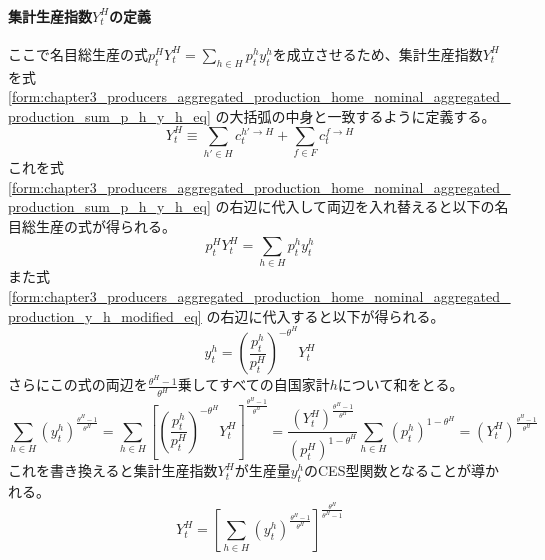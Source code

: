 \paragraph{集計生産指数\(Y_t^H\)の定義}
\label{sec:chapter3_producers_aggregated_production_home_Y_H_definition}
ここで名目総生産の式\(p_t^HY_t^H=\sum_{h\in H}p_t^hy_t^h\)を成立させるため、集計生産指数\(Y_t^H\)を式
\eqref{form:chapter3_producers_aggregated_production_home_nominal_aggregated_production_sum_p_h_y_h_eq}
の大括弧の中身と一致するように定義する。
\begin{equation}
\label{form:chapter3_producers_aggregated_production_home_Y_H_definition_Y_H_def}
    Y_t^H\equiv\sum_{h'\in H}c_t^{h'\to H}+\sum_{f\in F}c_t^{f\to H}
\end{equation}
これを式
\eqref{form:chapter3_producers_aggregated_production_home_nominal_aggregated_production_sum_p_h_y_h_eq}
の右辺に代入して両辺を入れ替えると以下の名目総生産の式が得られる。
\begin{equation}
\label{form:chapter3_producers_aggregated_production_home_Y_H_definition_p_H_Y_H_eq}
    p_t^HY_t^H=\sum_{h\in H}p_t^hy_t^h
\end{equation}
また式
\eqref{form:chapter3_producers_aggregated_production_home_nominal_aggregated_production_y_h_modified_eq}
の右辺に代入すると以下が得られる。
\begin{equation}
\label{form:chapter3_producers_aggregated_production_home_Y_H_definition_y_h_eq}
    y_t^h=\left(\frac{p_t^h}{p_t^H}\right)^{-\theta^H}Y_t^H
\end{equation}
さらにこの式の両辺を\(\frac{\theta^H-1}{\theta^H}\)乗してすべての自国家計\(h\)について和をとる。
\begin{equation}
\label{form:chapter3_producers_aggregated_production_home_Y_H_definition_sum_y_h_eq}
    \sum_{h\in H}(y_t^h)^{\frac{\theta^H-1}{\theta^H}}
    =\sum_{h\in H}\left[\left(\frac{p_t^h}{p_t^H}\right)^{-\theta^H}Y_t^H\right]^{\frac{\theta^H-1}{\theta^H}}
    =\frac{(Y_t^H)^{\frac{\theta^H-1}{\theta^H}}}{(p_t^H)^{1-\theta^H}}\sum_{h\in H}(p_t^h)^{1-\theta^H}
    =(Y_t^H)^{\frac{\theta^H-1}{\theta^H}}
\end{equation}
これを書き換えると集計生産指数\(Y_t^H\)が生産量\(y_t^h\)のCES型関数となることが導かれる。
\begin{equation}
\label{form:chapter3_producers_aggregated_production_home_Y_H_definition_Y_H_eq}
    Y_t^H=\left[\sum_{h\in H}(y_t^h)^{\frac{\theta^H-1}{\theta^H}}\right]^{\frac{\theta^H}{\theta^H-1}}
\end{equation}


